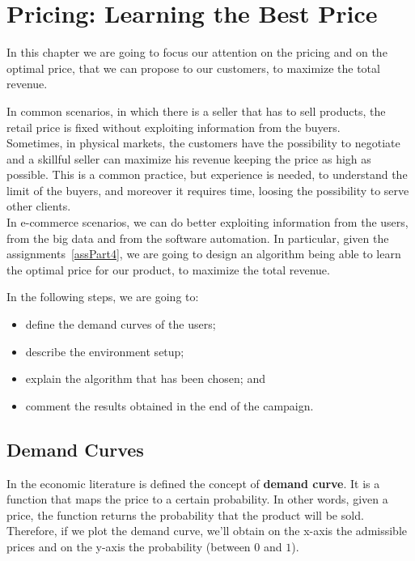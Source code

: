 \chapter{Pricing: Learning the Best Price}

In this chapter we are going to focus our attention on the pricing and on the optimal price, that we can propose to our customers, to maximize the total revenue.

In common scenarios, in which there is a seller that has to sell products, the retail price is fixed without exploiting information from the buyers.\\
Sometimes, in physical markets, the customers have the possibility to negotiate and a skillful seller can maximize his revenue keeping the price as high as possible. This is a common practice, but experience is needed, to understand the limit of the buyers, and moreover it requires time, loosing the possibility to serve other clients.\\
In e-commerce scenarios, we can do better exploiting information from the users, from the big data and from the software automation.
In particular, given the assignments~\ref{assPart4}, we are going to design an algorithm being able to learn the optimal price for our product, to maximize the total revenue.

In the following steps, we are going to:
\begin{itemize}
	\item define the demand curves of the users;
	\item describe the environment setup;
	\item explain the algorithm that has been chosen; and
	\item comment the results obtained in the end of the campaign.
\end{itemize}


\section{Demand Curves}

In the economic literature is defined the concept of \textbf{demand curve}.
It is a function that maps the price to a certain probability. In other words, given a price, the function returns the probability that the product will be sold. Therefore, if we plot the demand curve, we'll obtain on the x-axis the admissible prices and on the y-axis the probability (between $0$ and $1$).

